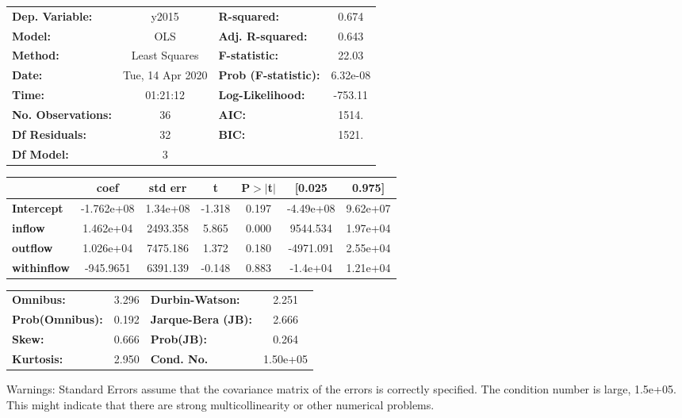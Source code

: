 \begin{center}
\begin{tabular}{lclc}
\toprule
\textbf{Dep. Variable:}    &      y2015       & \textbf{  R-squared:         } &     0.674   \\
\textbf{Model:}            &       OLS        & \textbf{  Adj. R-squared:    } &     0.643   \\
\textbf{Method:}           &  Least Squares   & \textbf{  F-statistic:       } &     22.03   \\
\textbf{Date:}             & Tue, 14 Apr 2020 & \textbf{  Prob (F-statistic):} &  6.32e-08   \\
\textbf{Time:}             &     01:21:12     & \textbf{  Log-Likelihood:    } &   -753.11   \\
\textbf{No. Observations:} &          36      & \textbf{  AIC:               } &     1514.   \\
\textbf{Df Residuals:}     &          32      & \textbf{  BIC:               } &     1521.   \\
\textbf{Df Model:}         &           3      & \textbf{                     } &             \\
\bottomrule
\end{tabular}
\begin{tabular}{lcccccc}
                    & \textbf{coef} & \textbf{std err} & \textbf{t} & \textbf{P$> |$t$|$} & \textbf{[0.025} & \textbf{0.975]}  \\
\midrule
\textbf{Intercept}  &   -1.762e+08  &     1.34e+08     &    -1.318  &         0.197        &    -4.49e+08    &     9.62e+07     \\
\textbf{inflow}     &    1.462e+04  &     2493.358     &     5.865  &         0.000        &     9544.534    &     1.97e+04     \\
\textbf{outflow}    &    1.026e+04  &     7475.186     &     1.372  &         0.180        &    -4971.091    &     2.55e+04     \\
\textbf{withinflow} &    -945.9651  &     6391.139     &    -0.148  &         0.883        &     -1.4e+04    &     1.21e+04     \\
\bottomrule
\end{tabular}
\begin{tabular}{lclc}
\textbf{Omnibus:}       &  3.296 & \textbf{  Durbin-Watson:     } &    2.251  \\
\textbf{Prob(Omnibus):} &  0.192 & \textbf{  Jarque-Bera (JB):  } &    2.666  \\
\textbf{Skew:}          &  0.666 & \textbf{  Prob(JB):          } &    0.264  \\
\textbf{Kurtosis:}      &  2.950 & \textbf{  Cond. No.          } & 1.50e+05  \\
\bottomrule
\end{tabular}
\end{center}

Warnings: \newline
 [1] Standard Errors assume that the covariance matrix of the errors is correctly specified. \newline
 [2] The condition number is large, 1.5e+05. This might indicate that there are \newline
 strong multicollinearity or other numerical problems.